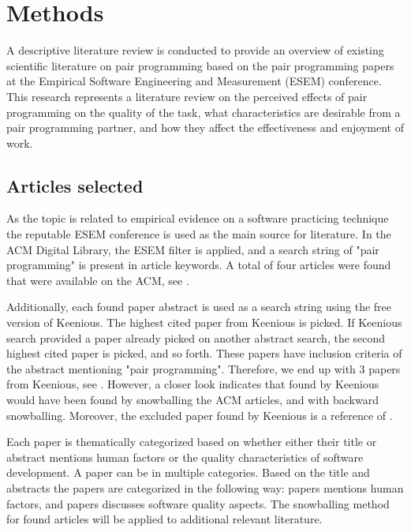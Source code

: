 \documentclass[conference]{IEEEtran}
\begin{document}
\section{Methods}

A descriptive literature review is conducted to provide an overview of existing scientific literature on pair programming based on the pair programming papers at the Empirical Software Engineering and Measurement (ESEM) conference. This research represents a literature review on the perceived effects of pair programming on the quality of the task, what characteristics are desirable from a pair programming partner, and how they affect the effectiveness and enjoyment of work. 

\subsection{Articles selected}

As the topic is related to empirical evidence on a software practicing technique the reputable ESEM conference is used as the main source for literature. In the ACM Digital Library, the ESEM filter is applied, and a search string of "pair programming" is present in article keywords. A total of four articles were found that were available on the ACM, see \cite{10.1145/2652524.2652529, 10.1145/1414004.1414026, 10.1145/1852786.1852816, 10.1145/1159733.1159749}.

Additionally, each found paper abstract is used as a search string using the free version of Keenious. The highest cited paper from Keenious is picked. If Keenious search provided a paper already picked on another abstract search, the second highest cited paper is picked, and so forth. These papers have inclusion criteria of the abstract mentioning "pair programming". Therefore, we end up with 3 papers from Keenious, see \cite{Williams2000Strengthening, Arisholm2007Evaluating, Hannay2009effectiveness}. However, a closer look indicates that \cite{Williams2000Strengthening, Arisholm2007Evaluating} found by Keenious would have been found by snowballing the ACM articles, and \cite{Hannay2009effectiveness} with backward snowballing. Moreover, the excluded paper \cite{ChamorroPremuzic2003Personality} found by Keenious is a reference of \cite{10.1145/1852786.1852816}.

Each paper is thematically categorized based on whether either their title or abstract mentions human factors or the quality characteristics of software development. A paper can be in multiple categories. Based on the title and abstracts the papers are categorized in the following way: papers \cite{10.1145/2652524.2652529, Williams2000Strengthening, 10.1145/1414004.1414026, Arisholm2007Evaluating, 10.1145/1852786.1852816, Hannay2009effectiveness} mentions human factors, and papers \cite{Williams2000Strengthening, 10.1145/1414004.1414026, Arisholm2007Evaluating, 10.1145/1159733.1159749, Hannay2009effectiveness} discusses software quality aspects. The snowballing method for found articles will be applied to additional relevant literature.
\end{document}
